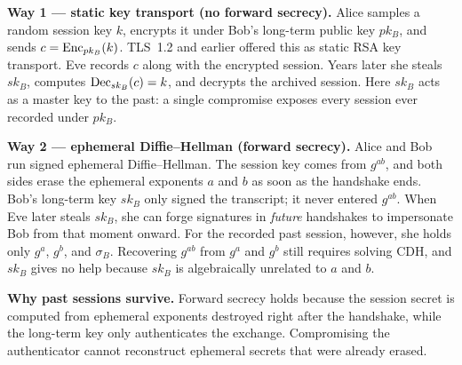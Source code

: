 \textbf{Way 1 --- static key transport (no forward secrecy).} Alice samples a
random session key $k$, encrypts it under Bob's long-term public key $pk_B$, and
sends $c = \operatorname{Enc}_{pk_B}(k)$. TLS~1.2 and earlier offered this as static RSA key
transport. Eve records $c$ along with the encrypted session. Years later she
steals $sk_B$, computes $\operatorname{Dec}_{sk_B}(c) = k$, and decrypts the archived session.
Here $sk_B$ acts as a master key to the past: a single compromise exposes every
session ever recorded under $pk_B$.

\textbf{Way 2 --- ephemeral Diffie--Hellman (forward secrecy).} Alice and Bob
run signed ephemeral Diffie--Hellman. The session key comes from $g^{ab}$, and
both sides erase the ephemeral exponents $a$ and $b$ as soon as the handshake
ends. Bob's long-term key $sk_B$ only signed the transcript; it never entered
$g^{ab}$. When Eve later steals $sk_B$, she can forge signatures in
\emph{future} handshakes to impersonate Bob from that moment onward. For the
recorded past session, however, she holds only $g^a$, $g^b$, and $\sigma_B$.
Recovering $g^{ab}$ from $g^a$ and $g^b$ still requires solving CDH, and $sk_B$
gives no help because $sk_B$ is algebraically unrelated to $a$ and $b$.

\begin{whybox}
\textbf{Why past sessions survive.}
Forward secrecy holds because the session secret is computed from ephemeral
exponents destroyed right after the handshake, while the long-term key only
authenticates the exchange. Compromising the authenticator cannot reconstruct
ephemeral secrets that were already erased.
\end{whybox}

